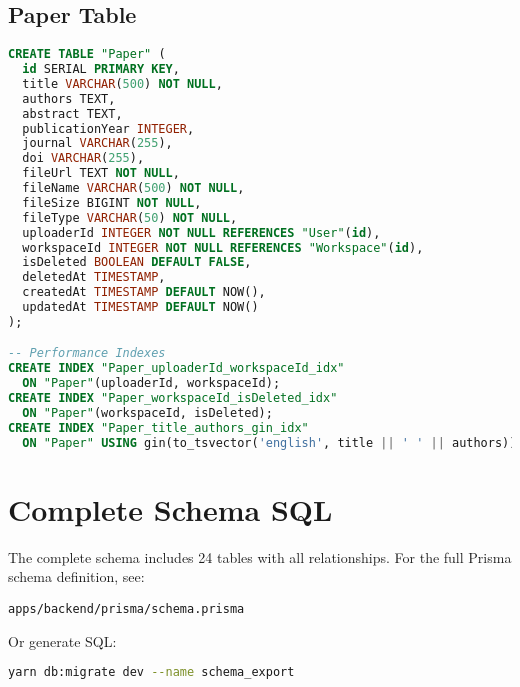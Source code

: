 \subsection{Paper Table}

\begin{lstlisting}[language=SQL, caption={Paper Table Schema}]
CREATE TABLE "Paper" (
  id SERIAL PRIMARY KEY,
  title VARCHAR(500) NOT NULL,
  authors TEXT,
  abstract TEXT,
  publicationYear INTEGER,
  journal VARCHAR(255),
  doi VARCHAR(255),
  fileUrl TEXT NOT NULL,
  fileName VARCHAR(500) NOT NULL,
  fileSize BIGINT NOT NULL,
  fileType VARCHAR(50) NOT NULL,
  uploaderId INTEGER NOT NULL REFERENCES "User"(id),
  workspaceId INTEGER NOT NULL REFERENCES "Workspace"(id),
  isDeleted BOOLEAN DEFAULT FALSE,
  deletedAt TIMESTAMP,
  createdAt TIMESTAMP DEFAULT NOW(),
  updatedAt TIMESTAMP DEFAULT NOW()
);

-- Performance Indexes
CREATE INDEX "Paper_uploaderId_workspaceId_idx" 
  ON "Paper"(uploaderId, workspaceId);
CREATE INDEX "Paper_workspaceId_isDeleted_idx" 
  ON "Paper"(workspaceId, isDeleted);
CREATE INDEX "Paper_title_authors_gin_idx" 
  ON "Paper" USING gin(to_tsvector('english', title || ' ' || authors));
\end{lstlisting}


\section{Complete Schema SQL}
\label{sec:schema-complete-sql}

\begin{infobox}
The complete schema includes 24 tables with all relationships. For the full Prisma schema definition, see:

\texttt{apps/backend/prisma/schema.prisma}

Or generate SQL:
\begin{lstlisting}[language=bash]
yarn db:migrate dev --name schema_export
\end{lstlisting}
\end{infobox}
